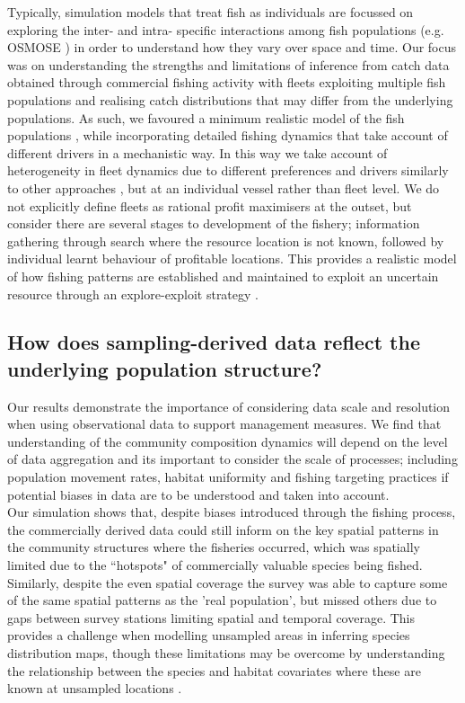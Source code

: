 \documentclass[review]{elsarticle}
\begin{document}
Typically, simulation models that treat fish as individuals are focussed on
exploring the inter- and intra- specific interactions among fish populations
(e.g. OSMOSE \cite{Shin2004}) in order to understand how they vary over space
and time. Our focus was on understanding the strengths and limitations of
inference from catch data obtained through commercial fishing activity with
fleets exploiting multiple fish populations and realising catch distributions
that may differ from the underlying populations. As such, we favoured a
minimum realistic model of the fish populations \citep{Plaganyi2014}, while
incorporating detailed fishing dynamics that take account of different drivers
in a mechanistic way. In this way we take account of heterogeneity in fleet
dynamics due to different preferences and drivers similarly to other approaches
\citep{Fulton2011}, but at an individual vessel rather than fleet level. We do
not explicitly define fleets as rational profit maximisers at the outset, but
consider there are several stages to development of the fishery; information
gathering through search where the resource location is not known,  followed by
individual learnt behaviour of profitable locations.  This provides a realistic
model of how fishing patterns are established and maintained to exploit an
uncertain resource through an explore-exploit strategy \citep{Mangel1983,
	Bailey2018}. 

\subsection{How does sampling-derived data reflect the underlying population
	structure?}


Our results demonstrate the importance of considering data scale and resolution
when using observational data to support management measures. We find that
understanding of the community composition dynamics will depend on the level of
data aggregation and its important to consider the scale of processes;
including population movement rates, habitat uniformity and fishing targeting
practices if potential biases in data are to be understood and taken into
account. \\

Our simulation shows that, despite biases introduced through the fishing
process, the commercially derived data could still inform on the key spatial
patterns in the community structures where the fisheries occurred, which was
spatially limited due to the ``hotspots" of commercially valuable species being
fished. Similarly, despite the even spatial coverage the survey was able to
capture some of the same spatial patterns as the 'real population', but missed
others due to gaps between survey stations limiting spatial and temporal
coverage. This provides a challenge when modelling unsampled areas in inferring
species distribution maps, though these limitations may be overcome by
understanding the relationship between the species and habitat covariates where
these are known at unsampled locations \citep{Robinson2011}. \\ 
\end{document}
